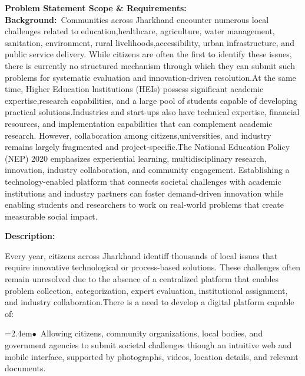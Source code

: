\documentclass[10pt,a4paper]{article}
\begin{document}
\begin{tcolorbox}[pscard, title={"\textbf{SIH26043} \quad $\vert$ \quad A digital platform to crowdsource societal challenges and facilitate collab...}]
\textbf{\color{sihnavy}Problem Statement Scope \& Requirements:}\\[0.15cm]
\vspace{0.18cm}\noindent\textbf{\color{sihnavy}Background:}~\small Communities across Jharkhand encounter numerous local challenges related to education,healthcare, agriculture, water management, sanitation, environment, rural livelihoods,accessibility, urban infrastructure, and public service delivery. While citizens are often the first to identify these issues, there is currently no structured mechanism through which they can submit such problems for systematic evaluation and innovation-driven resolution.At the same time, Higher Education lnstitutions (HEIs) possess significant academic expertise,research capabilities, and a large pool of students capable of developing practical solutions.Industries and start-ups also have technical expertise, financial resources, and implementation capabilities that can complement academic research. However, collaboration among citizens,universities, and industry remains largely fragmented and project-specific.The National Education Policy (NEP) 2020 emphasizes experiential learning, multidisciplinary research, innovation, industry collaboration, and community engagement. Establishing a technology-enabled platform that connects societal challenges with academic institutions and industry partners can foster demand-driven innovation while enabling students and researchers to work on real-world problems that create measurable social impact.\par\vspace{0.06cm}
\vspace{0.18cm}\noindent\textbf{\color{sihnavy}Description:}\par\vspace{0.06cm}
\noindent\small Every year, citizens across Jharkhand identiff thousands of local issues that require innovative technological or process-based solutions. These challenges often remain unresolved due to the absence of a centralized platform that enables problem collection, categorization, expert evaluation, institutional assignment, and industry collaboration.There is a need to develop a digital platform capable of:\par\vspace{0.06cm}
\noindent\hspace*{1.2em}\hangindent=2.4em\textcolor{sihblue}{$\bullet$}~\small Allowing citizens, community organizations, local bodies, and government agencies to submit societal challenges thiough an intuitive web and mobile interface, supported by photographs, videos, location details, and relevant documents.\par\vspace{0.05cm}

\end{tcolorbox}
\end{document}
